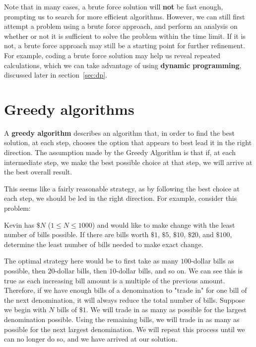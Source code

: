 Note that in many cases, a brute force solution will \textbf{not} be fast enough, prompting us to search for more efficient algorithms.  However, we can still first attempt a problem using a brute force approach, and perform an analysis on whether or not it is sufficient to solve the problem within the time limit. If it is not, a brute force approach may still be a starting point for further refinement. For example, coding a brute force solution may help us reveal repeated calculations, which we can take advantage of using \textbf{dynamic programming}, discussed later in section~\ref{sec:dp}.


\section{Greedy algorithms} \label{greedy}

A \textbf{greedy algorithm} describes an algorithm that, in order to find the best solution, at each step, chooses the option that appears to best lead it in the right direction.  The assumption made by the Greedy Algorithm is that if, at each intermediate step, we make the best possible choice at that step, we will arrive at the best overall result.

This seems like a fairly reasonable strategy, as by following the best choice at each step, we should be led in the right direction.  For example, consider this problem:

\begin{Problem}
Kevin has $ \$N $ ($ 1 \leq N \leq 1000 $) and would like to make change with the least number of bills possible.  If there are bills worth $ \$1 $, $ \$5 $, $ \$10 $, $ \$20 $, and $ \$100 $, determine the least number of bills needed to make exact change.
\end{Problem}

The optimal strategy here would be to first take as many $ 100 $-dollar bills as possible, then $ 20 $-dollar bills, then $ 10 $-dollar bills, and so on.  We can see this is true as each increasing bill amount is a multiple of the previous amount.  Therefore, if we have enough bills of a denomination to "trade in" for one bill of the next denomination, it will always reduce the total number of bills.  Suppose we begin with $ N $ bills of $ \$1 $.  We will trade in as many as possible for the largest denomination possible.  Using the remaining bills, we will trade in as many as possible for the next largest denomination.  We will repeat this process until we can no longer do so, and we have arrived at our solution.

